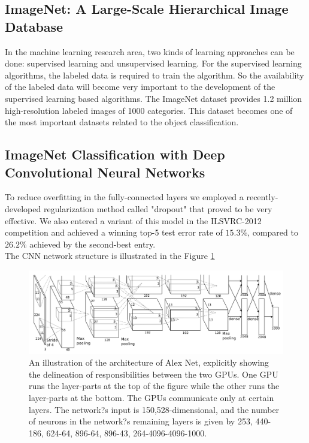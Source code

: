 \documentclass[a4paper,12pt]{article}
\begin{document}
\subsection{ImageNet: A Large-Scale Hierarchical Image Database\cite{imagenet_cvpr09}}
In the machine learning research area, two kinds of learning approaches can be done: supervised learning and unsupervised learning. For the supervised learning algorithms, the labeled data is required to train the algorithm. So the availability of the labeled data will become very important to the development of the supervised learning based algorithms. The ImageNet dataset \cite{imagenet_cvpr09} provides 1.2 million high-resolution labeled images of 1000 categories. This dataset becomes one of the most important datasets related to the object classification.\\

\subsection{ImageNet Classification with Deep Convolutional Neural Networks\cite{NIPS2012_4824}}
To reduce overfitting in the fully-connected layers we employed a recently-developed regularization method called "dropout"\cite{DBLP:journals/corr/abs-1207-0580} that proved to be very effective. We also entered a variant of this model in the ILSVRC-2012 competition and achieved a winning top-5 test error rate of $15.3\%$, compared to $26.2\%$ achieved by the second-best entry.\\
The CNN network structure is illustrated in the Figure \ref{fig:alexnet}


 \begin{figure}[H]
  \begin{center}
      \includegraphics[scale=0.55]{alexnet.png}
\end{center}
\caption{An illustration of the architecture of Alex Net, explicitly showing the delineation of responsibilities between the two GPUs. One GPU runs the layer-parts at the top of the figure while the other runs the layer-parts at the bottom. The GPUs communicate only at certain layers. The network?s input is 150,528-dimensional, and the number of neurons in the network?s remaining layers is given by 253, 440-186, 624-64, 896-64, 896-43, 264-4096-4096-1000\cite{NIPS2012_4824}.}
 \label{fig:alexnet}
 \end{figure}
\end{document}
